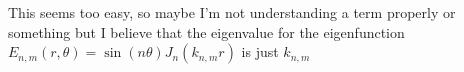\documentclass{article}
\begin{document}
This seems too easy, so maybe I'm not understanding a term properly or something but I believe that the eigenvalue for the eigenfunction $E_{n,m}(r,\theta)=\sin(n\theta)J_n(k_{n,m}r)$ is just $k_{n,m}$
\end{document}
